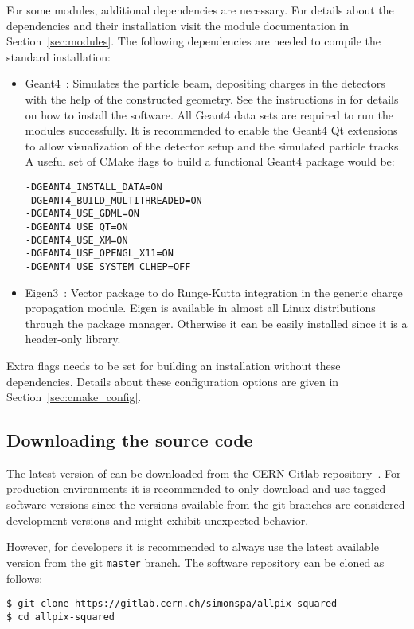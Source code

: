 For some modules, additional dependencies are necessary.
For details about the dependencies and their installation visit the module documentation in Section~\ref{sec:modules}.
The following dependencies are needed to compile the standard installation:
\begin{itemize}
\item Geant4~\cite{geant4}: Simulates the particle beam, depositing charges in the detectors with the help of the constructed geometry.
See the instructions in \cite{geant4installation} for details on how to install the software.
All Geant4 data sets are required to run the modules successfully.
It is recommended to enable the Geant4 Qt extensions to allow visualization of the detector setup and the simulated particle tracks.
A useful set of CMake flags to build a functional Geant4 package would be:
\begin{verbatim}
-DGEANT4_INSTALL_DATA=ON
-DGEANT4_BUILD_MULTITHREADED=ON
-DGEANT4_USE_GDML=ON
-DGEANT4_USE_QT=ON
-DGEANT4_USE_XM=ON 
-DGEANT4_USE_OPENGL_X11=ON
-DGEANT4_USE_SYSTEM_CLHEP=OFF
\end{verbatim}
\item Eigen3~\cite{eigen3}: Vector package to do Runge-Kutta integration in the generic charge propagation module.
Eigen is available in almost all Linux distributions through the package manager.
Otherwise it can be easily installed since it is a header-only library.
\end{itemize}
Extra flags needs to be set for building an \apsq installation without these dependencies.
Details about these configuration options are given in Section~\ref{sec:cmake_config}.

\subsection{Downloading the source code}
The latest version of \apsq can be downloaded from the CERN Gitlab repository~\cite{ap2-repo}.
For production environments it is recommended to only download and use tagged software versions since the versions available from the git branches are considered development versions and might exhibit unexpected behavior.

However, for developers it is recommended to always use the latest available version from the git \texttt{master} branch.
The software repository can be cloned as follows:

\begin{verbatim}
$ git clone https://gitlab.cern.ch/simonspa/allpix-squared
$ cd allpix-squared
\end{verbatim}

